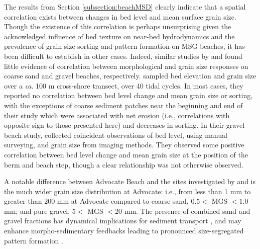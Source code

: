 The results from Section \ref{subsection:beachMSD} clearly indicate that a spatial correlation exists between changes in bed level and mean surface grain size. Though the existence of this correlation is perhaps unsurprising given the acknowledged influence of bed texture on near-bed hydrodynamics and the prevalence of grain size sorting and pattern formation on MSG beaches, it has been difficult to establish in other cases. Indeed, similar studies by \citet{Masselink_etal2007} and \citet{Austin_Buscombe2008} found little evidence of correlation between morphological and grain size responses on coarse sand and gravel beaches, respectively. \citeauthor{Masselink_etal2007} sampled bed elevation and grain size over a \textit{ca}. 100 m cross-shore transect, over 40 tidal cycles. In most cases, they reported no correlation between bed level change and mean grain size or sorting, with the exceptions of coarse sediment patches near the beginning and end of their study which were associated with net erosion (i.e., correlations with opposite sign to those presented here) and decreases in sorting. In their gravel beach study, \citet{Austin_Buscombe2008} collected coincident observations of bed level, using manual surveying, and grain size from imaging methods. They observed some positive correlation between bed level change and mean grain size at the position of the berm and beach step, though a clear relationship was not otherwise observed. 

A notable difference between Advocate Beach and the sites investigated by \citet{Masselink_etal2007} and \citet{Austin_Buscombe2008} is the much wider grain size distribution at Advocate: i.e., from less than 1 mm to greater than 200 mm at Advocate compared to coarse sand, $0.5 <$ MGS $< 1.0$ mm; and pure gravel, $5 <$ MGS $< 20$ mm. The presence of combined sand and gravel fractions has dynamical implications for sediment transport \citep[e.g.,][]{Wilcock_McArdell1993, Wilcock_McArdell1997, Wilcock_Crowe2003}, and may enhance morpho-sedimentary feedbacks leading to pronounced size-segregated pattern formation \citep[e.g.,][]{LonguetHiggins_Parkin1962, Guest_Hay2019}. 

